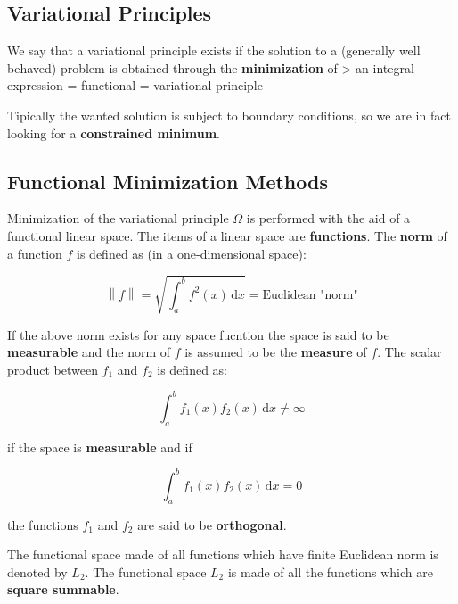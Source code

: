 \documentclass{article}
\begin{document}
\subsection{Variational Principles}\label{variational-principles}

We say that a variational principle exists if the solution to a
(generally well behaved) problem is obtained through the
\textbf{minimization} of \textgreater{} an integral expression =
functional = variational principle

Tipically the wanted solution is subject to boundary conditions, so we
are in fact looking for a \textbf{constrained minimum}.

\subsection{Functional Minimization
Methods}\label{functional-minimization-methods}

Minimization of the variational principle \(\Omega\) is performed with
the aid of a functional linear space. The items of a linear space are
\textbf{functions}. The \textbf{norm} of a function \(f\) is defined as
(in a one-dimensional space):

\[
    \left\lVert f \right\rVert = \sqrt{\int^{b}_{a}{f^{2}(x)}\, \mathrm{d}x} = \text{Euclidean "norm"}
\]

If the above norm exists for any space fucntion the space is said to be
\textbf{measurable} and the norm of \(f\) is assumed to be the
\textbf{measure} of \(f\). The scalar product between \(f_1\) and
\(f_2\) is defined as:

\[
    \int^{b}_{a}{f_1(x)f_2(x)}\, \mathrm{d}x \neq \infty
\]

if the space is \textbf{measurable} and if

\[
    \int^{b}_{a}{f_1(x)f_2(x)}\, \mathrm{d}x = 0
\]

the functions \(f_1\) and \(f_2\) are said to be \textbf{orthogonal}.

The functional space made of all functions which have finite Euclidean
norm is denoted by \(L_2\). The functional space \(L_2\) is made of all
the functions which are \textbf{square summable}.
\end{document}
